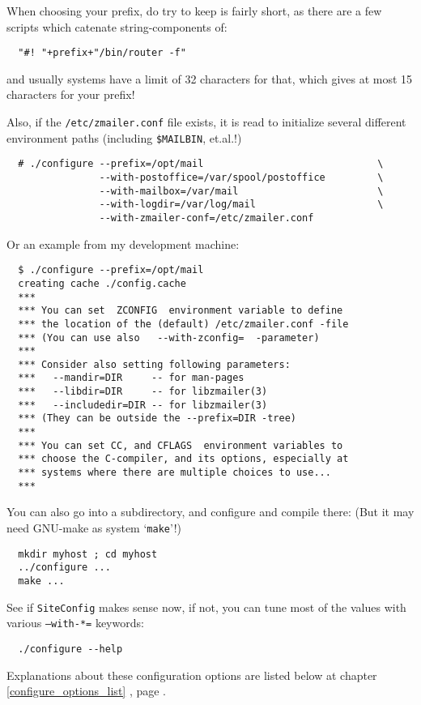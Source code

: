 When choosing your prefix, do try to keep is fairly short, as
there are a few scripts which catenate string-components of:%
\begin{verbatim}
  "#! "+prefix+"/bin/router -f"
\end{verbatim}%
and usually systems have a limit of 32 characters for that,
which gives at most 15 characters for your prefix!

Also, if the {\tt /etc/zmailer.conf} file exists, it is read
to initialize several different environment paths (including
{\tt \$MAILBIN}, et.al.!)

\begin{verbatim}
  # ./configure --prefix=/opt/mail                              \
                --with-postoffice=/var/spool/postoffice         \
                --with-mailbox=/var/mail                        \
                --with-logdir=/var/log/mail                     \
                --with-zmailer-conf=/etc/zmailer.conf
\end{verbatim}

Or an example from my development machine:
\begin{verbatim}
  $ ./configure --prefix=/opt/mail
  creating cache ./config.cache
  ***
  *** You can set  ZCONFIG  environment variable to define
  *** the location of the (default) /etc/zmailer.conf -file
  *** (You can use also   --with-zconfig=  -parameter)
  ***
  *** Consider also setting following parameters:
  ***   --mandir=DIR     -- for man-pages
  ***   --libdir=DIR     -- for libzmailer(3)
  ***   --includedir=DIR -- for libzmailer(3)
  *** (They can be outside the --prefix=DIR -tree)
  ***
  *** You can set CC, and CFLAGS  environment variables to
  *** choose the C-compiler, and its options, especially at
  *** systems where there are multiple choices to use...
  ***
\end{verbatim}

You can also go into a subdirectory, and configure and
compile there: (But it may need GNU-make as system `{\tt make}'!)
\begin{verbatim}
  mkdir myhost ; cd myhost
  ../configure ...
  make ...
\end{verbatim}

See if {\tt SiteConfig} makes sense now, if not, you can tune
most of the values with various {\tt --with-*=} keywords:
\begin{verbatim}
  ./configure --help
\end{verbatim}
Explanations about these configuration options are listed below
at chapter \ref{configure_options_list}%
, page \pageref{configure_options_list}%
.

